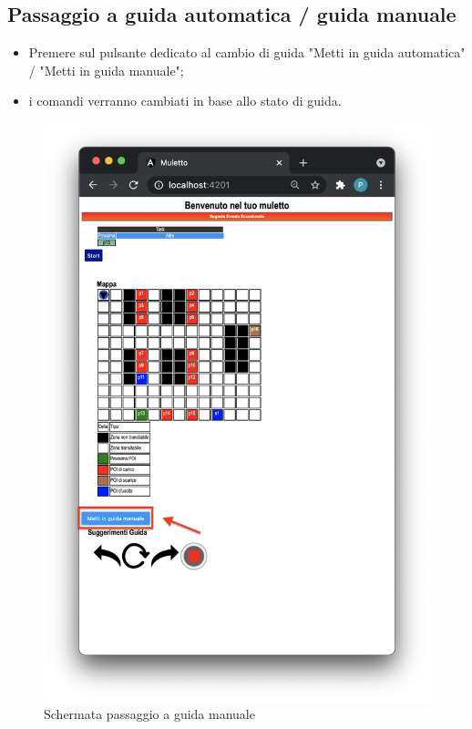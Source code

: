 \subsection{Passaggio a guida automatica / guida manuale}
\begin{itemize}
    \item Premere sul pulsante dedicato al cambio di guida "Metti in guida automatica" / "Metti in guida manuale";
    \item i comandi verranno cambiati in base allo stato di guida.
\end{itemize}
\begin{figure}[H]
\centering
\includegraphics[scale=0.45]{res/images/forklift_guidamanuale.png}
\caption{Schermata passaggio a guida manuale}
\end{figure}

